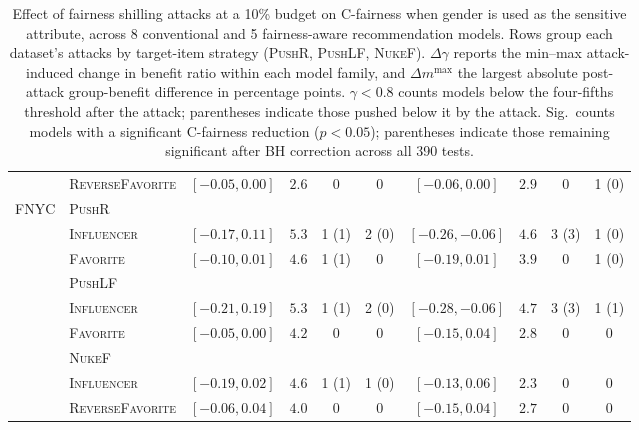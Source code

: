 \begin{table}
\begin{adjustbox}{max width=\textwidth}
\begin{tabular}{l l cccc cccc}
 & \quad \textsc{ReverseFavorite} & $[-0.05, 0.00]$ & $2.6$ & 0 & 0 & $[-0.06, 0.00]$ & $2.9$ & 0 & 1 (0) \\
\cmidrule(lr){1-10}
\multirow{9}{*}{FNYC} & \multicolumn{9}{l}{\textsc{PushR}} \\
 & \quad \textsc{Influencer} & $[-0.17, 0.11]$ & $5.3$ & 1 (1) & 2 (0) & $[-0.26, -0.06]$ & $4.6$ & 3 (3) & 1 (0) \\
 & \quad \textsc{Favorite} & $[-0.10, 0.01]$ & $4.6$ & 1 (1) & 0 & $[-0.19, 0.01]$ & $3.9$ & 0 & 1 (0) \\
\addlinespace[2pt]
 & \multicolumn{9}{l}{\textsc{PushLF}} \\
 & \quad \textsc{Influencer} & $[-0.21, 0.19]$ & $5.3$ & 1 (1) & 2 (0) & $[-0.28, -0.06]$ & $4.7$ & 3 (3) & 1 (1) \\
 & \quad \textsc{Favorite} & $[-0.05, 0.00]$ & $4.2$ & 0 & 0 & $[-0.15, 0.04]$ & $2.8$ & 0 & 0 \\
\cmidrule(lr){2-10}
 & \multicolumn{9}{l}{\textsc{NukeF}} \\
 & \quad \textsc{Influencer} & $[-0.19, 0.02]$ & $4.6$ & 1 (1) & 1 (0) & $[-0.13, 0.06]$ & $2.3$ & 0 & 0 \\
 & \quad \textsc{ReverseFavorite} & $[-0.06, 0.04]$ & $4.0$ & 0 & 0 & $[-0.15, 0.04]$ & $2.7$ & 0 & 0 \\
\bottomrule
\end{tabular}
\end{adjustbox}
\caption{Effect of fairness shilling attacks at a 10\% budget on C-fairness when gender is used as the sensitive attribute, across 8 conventional and 5 fairness-aware recommendation models. Rows group each dataset's attacks by target-item strategy (\textsc{PushR}, \textsc{PushLF}, \textsc{NukeF}). $\Delta\gamma$ reports the min--max attack-induced change in benefit ratio within each model family, and $\Delta m^{\max}$ the largest absolute post-attack group-benefit difference in percentage points. $\gamma < 0.8$ counts models below the four-fifths threshold after the attack; parentheses indicate those pushed below it by the attack. Sig.\ counts models with a significant C-fairness reduction ($p < 0.05$); parentheses indicate those remaining significant after BH correction across all 390 tests.}
\label{tab:cfair_attacks_gender_b10}
\end{table}
